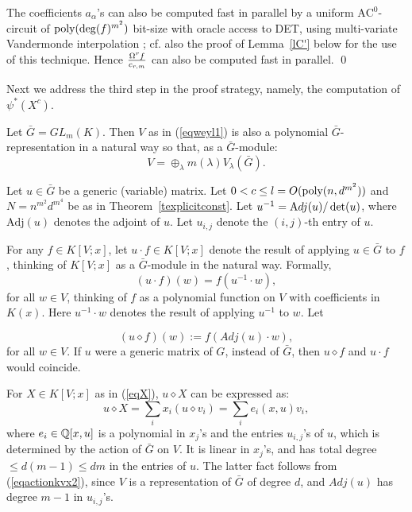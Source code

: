 \documentclass[11pt]{article}
\begin{document}
The coefficients $a_\alpha$'s can also  be computed fast in parallel 
by  a uniform  $\mbox{AC}^0$-circuit of 
${\mbox {poly}}(\deg(f)^{m^2})$ bit-size with oracle access to DET,
using  multi-variate Vandermonde interpolation \cite{strassen,yehu}; 
cf. also the proof of Lemma~\ref{lC'} below for the use of this technique. 
Hence  ${\frac {\Omega^r f} {c_{r,m}}}$  can also be computed  fast in parallel.  \qed 

Next  we address the third step in the proof strategy, namely, the computation 
of $\psi^*(X^c)$.

Let $\bar G=GL_m(K)$. Then  $V$ as in (\ref{eqweyl1})
is also a polynomial $\bar G$-representation in a natural way so that, as a $\bar G$-module:
\begin{equation} \label{eqweyl2}
V=\oplus_{\lambda} m(\lambda) V_\lambda(\bar G).
\end{equation} 

Let $u \in \bar G$ be a generic (variable)  matrix. Let $0<c\le l=O({\mbox {poly}}(n,d^{m^2}))$ and $N=n^{m^2} d^{m^4}$ be as in  Theorem~\ref{texplicitconst}. Let 
$u^{-1}= {\mbox Adj}(u)/\det(u)$, where $\mbox{Adj}(u)$ denotes the adjoint of $u$.
Let $u_{i, j}$ denote the $(i,j)$-th entry of $u$.

For any $f \in K[V;x]$, 
let $u \cdot f \in K[V;x]$ denote the result of applying $u \in \bar G$ to $f$, thinking of 
$K[V;x]$ as a $\bar G$-module in the natural way. Formally, 
\begin{equation} \label{eqactionkvx}
(u \cdot f) (w) = f(u^{-1} \cdot w),
\end{equation}
for all $w \in V$, thinking of $f$ as a polynomial function on $V$ with coefficients in $K(x)$.
Here $u^{-1} \cdot w$ denotes the result of applying $u^{-1}$ to $w$.
Let

\begin{equation} \label{eqactionkvx2}
(u \diamond f) (w) := f(Adj(u) \cdot  w),
\end{equation}
for all $w \in V$. If $u$ were a generic matrix of $G$, instead of $\bar G$,
then $u \diamond f$ and $u \cdot f$ would coincide.

For $X \in K[V;x]$ as in (\ref{eqX}),
  $u \diamond  X$ can be expressed as:
\begin{equation}  \label{eqlinform1}
u \diamond  X = \sum_i x_i (u \diamond v_i) = \sum_i  e_i(x, u) v_i,
\end{equation}
where $e_i \in \mathbb{Q}[ x, u]$ is a polynomial in $x_j$'s and the entries $u_{i,j}$'s
of $u$, which is determined by the action of $\bar G$ on $V$. It 
is  linear in $x_j$'s, and  has total degree $\le d (m-1) \le d m$ 
in the entries of $u$. The latter fact follows
from (\ref{eqactionkvx2}), 
since $V$ is a representation of $\bar G$ of degree $d$, and $Adj(u)$ has degree $m-1$ in $u_{i,j}$'s.
\end{document}
